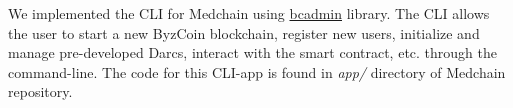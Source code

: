 We implemented the CLI for Medchain using \href{https://github.com/dedis/cothority/tree/master/byzcoin/bcadmin}{bcadmin} library. The CLI allows the user to start a new ByzCoin blockchain, register new users, initialize and manage pre-developed Darcs, interact with the smart contract, etc. through the command-line. The code for this CLI-app is found in \textit{app/} directory of Medchain repository. 

